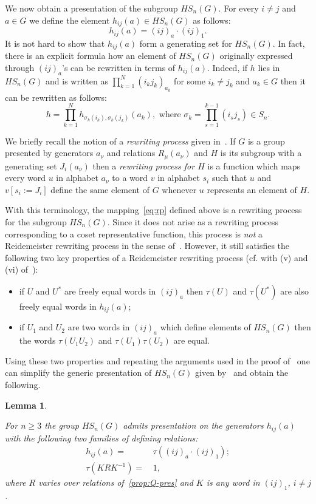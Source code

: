 \documentclass[oneside, 12pt]{amsart}
\theoremstyle{plain}
\numberwithin{equation}{section}
\newtheorem{lemma}{Lemma}
\numberwithin{lemma}{section}
\theoremstyle{remark}
\theoremstyle{definition}
\begin{document}
We now obtain a presentation of the subgroup $HS_n(G)$.
For every $i\neq j$ and $a\in G$ we define the element $h_{ij}(a) \in HS_n(G)$ as follows:
\begin{equation} \label{eq:h-def} 
h_{ij}(a) = (ij)_{a} \cdot (ij)_1. 
\end{equation}
It is not hard to show that $h_{ij}(a)$ form a generating set for $HS_n(G)$.
In fact, there is an explicit formula how an element of $HS_n(G)$ originally expressed through $(ij)_{a}$'s can be rewritten in terms of $h_{ij}(a)$.
Indeed, if $h$ lies in $HS_n(G)$ and is written as $\prod_{k=1}^N(i_k j_k)_{a_k}$ for some $i_k\neq j_k$ and $a_k\in G$ then it can be rewritten as follows:
\begin{equation} \label{eq:rp} \tag{$\tau$}
 h = \prod_{k=1}^N h_{\sigma_k(i_k), \sigma_k(j_k)}(a_k),\text{ where } \sigma_k=\prod_{s=1}^{k-1} (i_s j_s) \in S_n. \end{equation}

We briefly recall the notion of a {\it rewriting process} given in~\cite[\S~2.3]{MKS76}.
If $G$ is a group presented by generators $a_\nu$ and relations $R_{\mu}(a_{\nu})$ and $H$ is its subgroup with a generating set $J_i(a_\nu)$ then
 a {\it rewriting process for $H$} is a function which maps every word $u$ in alphabet $a_\nu$ to a word $v$ in alphabet $s_i$ such that
 $u$ and $v[s_i:=J_i]$ define the same element of $G$ whenever $u$ represents an element of $H$.

With this terminology, the mapping~\eqref{eq:rp} defined above is a rewriting process for the subgroup $HS_n(G)$.
Since it does not arise as a rewriting process corresponding to a coset representative function,
this process is {\it not} a Reidemeister rewriting process in the sense of~\cite[\S~2.3]{MKS76}.
However, it still satisfies the following two key properties of a Reidemeister rewriting process (cf. with (v) and (vi) of~\cite[\S~2.3]{MKS76}): 
\begin{itemize}
 \item if $U$ and $U^*$ are freely equal words in $(ij)_a$ then $\tau(U)$ and $\tau(U^*)$ are also freely equal words in $h_{ij}(a)$;
 \item if $U_1$ and $U_2$ are two words in $(ij)_a$ which define elements of $HS_n(G)$ then the words $\tau(U_1U_2)$ and $\tau(U_1) \tau(U_2)$ are equal.
\end{itemize}
Using these two properties and repeating the arguments used in the proof of~\cite[Theorem~2.8]{MKS76}
one can simplify the generic presentation of $HS_n(G)$ given by~\cite[Theorem~2.6]{MKS76} and obtain the following.
\begin{lemma} \label{lm:h-gen}

 For $n\geq 3$ the group $HS_n(G)$ admits presentation on the generators $h_{ij}(a)$ with the following two families of defining relations:
 \begin{align}
  h_{ij}(a) = &\, \tau\left((ij)_a \cdot (ij)_1\right); \label{eq:tau1} \\
  \tau(KRK^{-1}) = &\, 1, \label{eq:tau2} 
 \end{align}  
 where $R$ varies over relations of~\cref{prop:Q-pres} and $K$ is any word in $(ij)_1$, $i\neq j$.
\end{lemma}
\end{document}

